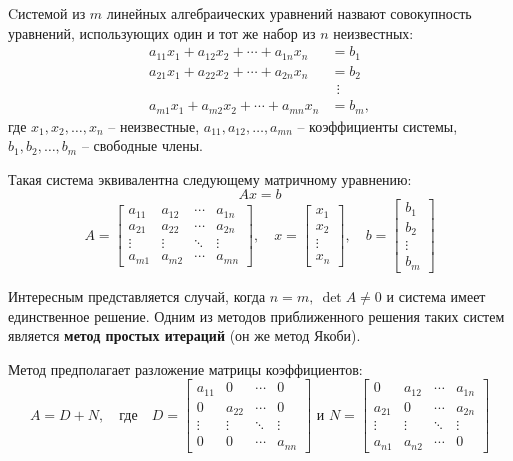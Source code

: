 \documentclass[report.tex]{subfiles}
\begin{document}
    Cистемой из $m$ линейных алгебраических уравнений назвают совокупность уравнений,
    использующих один и тот же набор из $n$ неизвестных:
    \[\begin{aligned}
          a_{11}x_{1}+a_{12}x_{2}+ \cdots +a_{1n}x_{n} & =b_{1} \\
          a_{21}x_{1}+a_{22}x_{2}+ \cdots +a_{2n}x_{n} & =b_{2} \\
          &\ \ \vdots \\
          a_{m1}x_{1}+a_{m2}x_{2}+ \cdots +a_{mn}x_{n} & =b_{m},
    \end{aligned}\]
    где $x_{1},x_{2},\ldots,x_{n}$ -- неизвестные, $a_{11},a_{12},\ldots,a_{mn}$ -- коэффициенты системы,
    $b_{1},b_{2},\ldots,b_{m}$ -- свободные члены.

    Такая система эквивалентна следующему матричному уравнению:
    \[Ax=b\]
    \[A={\begin{bmatrix}
             a_{11} & a_{12} & \cdots & a_{1n} \\
             a_{21} & a_{22} & \cdots & a_{2n} \\
             \vdots & \vdots & \ddots & \vdots \\
             a_{m1} & a_{m2} & \cdots & a_{mn}
    \end{bmatrix}}, \quad
    x = {\begin{bmatrix}
             x_{1} \\ x_{2} \\ \vdots \\x_{n}
    \end{bmatrix}}, \quad
    b ={\begin{bmatrix}
            b_{1} \\ b_{2} \\ \vdots \\ b_{m}
    \end{bmatrix}}\]

    Интересным представляется случай, когда $n=m, \ \det{A} \ne 0$ и система имеет единственное решение.
    Одним из методов приближенного решения таких систем является \textbf{метод простых итераций} (он же метод Якоби).

    Метод предполагает разложение матрицы коэффициентов:
    \[A=D+N, \quad \text{где} \quad
    D={\begin{bmatrix}
           a_{11} & 0      & \cdots & 0      \\
           0      & a_{22} & \cdots & 0      \\
           \vdots & \vdots & \ddots & \vdots \\
           0      & 0      & \cdots & a_{nn}
    \end{bmatrix}}
        {\text{ и }}
    N={\begin{bmatrix}
           0      & a_{12} & \cdots & a_{1n} \\
           a_{21} & 0      & \cdots & a_{2n} \\
           \vdots & \vdots & \ddots & \vdots \\
           a_{n1} & a_{n2} & \cdots & 0
    \end{bmatrix}}\]
\end{document}
